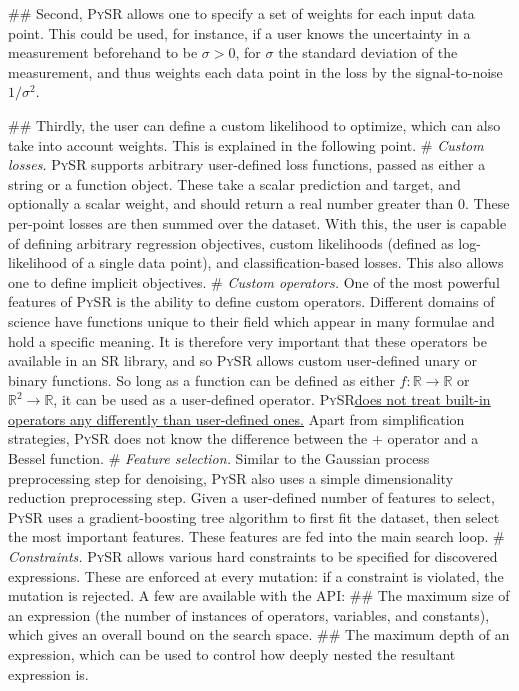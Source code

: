 \documentclass[letterpaper,twocolumn]{scrartcl}
\newcommand\pysr{\textsc{PySR}\xspace}
\begin{document}
\begin{linenumbers}
\begin{easylist}[itemize]
## Second, \pysr allows one to specify a set of weights for each input data point. This could be used, for instance, if a user knows the uncertainty in a measurement beforehand to be $\sigma>0$, for $\sigma$ the standard deviation of the measurement, and thus weights each data point in the loss by the signal-to-noise $1/\sigma^2$.

## Thirdly, the user can define a custom likelihood to optimize, which can also take into account weights. This is explained in the following point.
# \textit{Custom losses.}
\pysr supports arbitrary user-defined loss functions, passed as either a string or a function object.
These take a scalar prediction and target, and optionally a scalar weight, and should return a real number greater than 0.
These per-point losses are then summed over the dataset.
With this, the user is capable of defining arbitrary regression objectives, custom likelihoods (defined as log-likelihood of a single data point), and classification-based losses.
This also allows one to define implicit objectives.
# \textit{Custom operators.}
One of the most powerful features of \pysr is the ability to define custom operators.
Different domains of science have functions unique to their field which appear in many formulae and hold a specific meaning.
It is therefore very important that these operators be available in an SR library, and so \pysr allows custom user-defined unary or binary functions.
So long as a function can be defined as either
$f:\mathbb{R}\rightarrow \mathbb{R}$ or $\mathbb{R}^2\rightarrow\mathbb{R}$, it can be used as a user-defined operator.
\pysr \ul{does not treat built-in operators any differently than user-defined ones.}
Apart from simplification strategies, \pysr does not know the difference between the $+$ operator and a Bessel function.
# \textit{Feature selection.}
Similar to the Gaussian process preprocessing step for denoising, \pysr also uses a simple dimensionality reduction preprocessing step.
Given a user-defined number of features to select, \pysr uses a gradient-boosting tree algorithm to first fit the dataset, then select the most important features.
These features are fed into the main search loop.
# \textit{Constraints.}
\pysr allows various hard constraints to be specified for discovered expressions.
These are enforced at every mutation: if a constraint is violated, the mutation is rejected. A few are available with the API:
## The maximum size of an expression (the number of instances of operators, variables, and constants), which gives an overall bound on the search space.
## The maximum depth of an expression, which can be used to control how deeply nested the resultant expression is.

\end{easylist}
\end{linenumbers}
\end{document}
